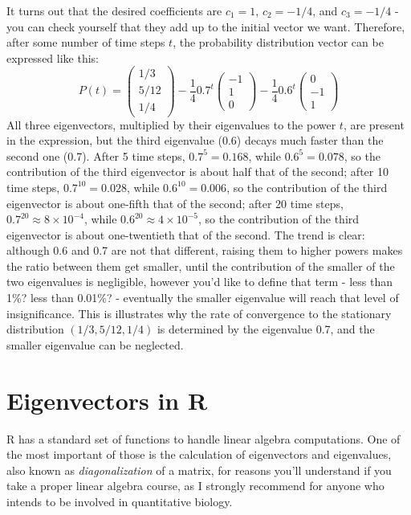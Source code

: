 \documentclass[
]{book}
\theoremstyle{definition}
\theoremstyle{definition}
\theoremstyle{definition}
\theoremstyle{remark}
\begin{document}
It turns out that the desired coefficients are \(c_1 = 1\), \(c_2 = -1/4\), and \(c_3 = -1/4\) - you can check yourself that they add up to the initial vector we want. Therefore, after some number of time steps \(t\), the probability distribution vector can be expressed like this:
\[ P(t) = \left(\begin{array}{c} 1/3     \\  5/12  \\ 1/4 \end{array}\right) -\frac{1}{4} 0.7^t \left(\begin{array}{c} -1   \\ 1  \\ 0 \end{array}\right)  -\frac{1}{4} 0.6^t \left(\begin{array}{c} 0  \\ -1  \\ 1 \end{array}\right)\]
All three eigenvectors, multiplied by their eigenvalues to the power \(t\), are present in the expression, but the third eigenvalue (0.6) decays much faster than the second one (0.7). After 5 time steps, \(0.7^5 = 0.168\), while \(0.6^5 = 0.078\), so the contribution of the third eigenvector is about half that of the second; after 10 time steps, \(0.7^{10} = 0.028\), while \(0.6^{10} = 0.006\), so the contribution of the third eigenvector is about one-fifth that of the second; after 20 time steps, \(0.7^{20} \approx 8 \times 10^{-4}\), while \(0.6^{20} \approx 4 \times 10^{-5}\), so the contribution of the third eigenvector is about one-twentieth that of the second. The trend is clear: although 0.6 and 0.7 are not that different, raising them to higher powers makes the ratio between them get smaller, until the contribution of the smaller of the two eigenvalues is negligible, however you'd like to define that term - less than 1\%? less than 0.01\%? - eventually the smaller eigenvalue will reach that level of insignificance. This is illustrates why the rate of convergence to the stationary distribution \((1/3, 5/12, 1/4)\) is determined by the eigenvalue 0.7, and the smaller eigenvalue can be neglected.

\hypertarget{eigenvectors-in-r}{%
\section{Eigenvectors in R}\label{eigenvectors-in-r}}

R has a standard set of functions to handle linear algebra computations. One of the most important of those is the calculation of eigenvectors and eigenvalues, also known as \emph{diagonalization} of a matrix, for reasons you'll understand if you take a proper linear algebra course, as I strongly recommend for anyone who intends to be involved in quantitative biology.
\end{document}
